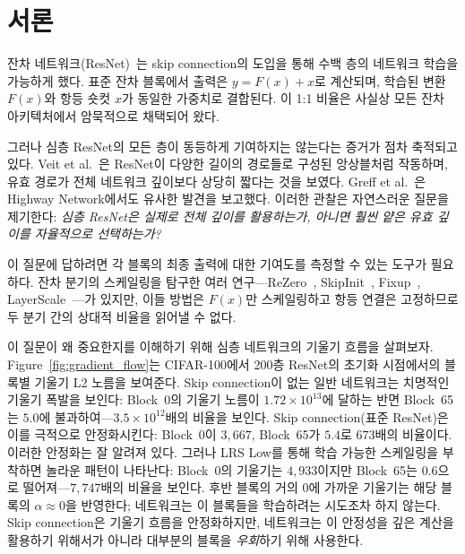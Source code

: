 \documentclass[preprint,12pt]{elsarticle}
\begin{document}
\section{서론}
\label{sec:intro}

잔차 네트워크(ResNet)~\cite{he2016deep}는 skip connection의 도입을 통해 수백 층의 네트워크 학습을 가능하게 했다. 표준 잔차 블록에서 출력은 $y = F(x) + x$로 계산되며, 학습된 변환 $F(x)$와 항등 숏컷 $x$가 동일한 가중치로 결합된다. 이 1:1 비율은 사실상 모든 잔차 아키텍처에서 암묵적으로 채택되어 왔다.

그러나 심층 ResNet의 모든 층이 동등하게 기여하지는 않는다는 증거가 점차 축적되고 있다. Veit et al.~\cite{veit2016residual}은 ResNet이 다양한 길이의 경로들로 구성된 앙상블처럼 작동하며, 유효 경로가 전체 네트워크 깊이보다 상당히 짧다는 것을 보였다. Greff et al.~\cite{greff2017highway}은 Highway Network에서도 유사한 발견을 보고했다. 이러한 관찰은 자연스러운 질문을 제기한다: \emph{심층 ResNet은 실제로 전체 깊이를 활용하는가, 아니면 훨씬 얕은 유효 깊이를 자율적으로 선택하는가?}

이 질문에 답하려면 각 블록의 최종 출력에 대한 기여도를 측정할 수 있는 도구가 필요하다. 잔차 분기의 스케일링을 탐구한 여러 연구---ReZero~\cite{bachlechner2021rezero}, SkipInit~\cite{de2020batch}, Fixup~\cite{zhang2019fixup}, LayerScale~\cite{touvron2021going}---가 있지만, 이들 방법은 $F(x)$만 스케일링하고 항등 연결은 고정하므로 두 분기 간의 상대적 비율을 읽어낼 수 없다.

이 질문이 왜 중요한지를 이해하기 위해 심층 네트워크의 기울기 흐름을 살펴보자. Figure~\ref{fig:gradient_flow}는 CIFAR-100에서 200층 ResNet의 초기화 시점에서의 블록별 기울기 L2 노름을 보여준다. Skip connection이 없는 일반 네트워크는 치명적인 기울기 폭발을 보인다: Block~0의 기울기 노름이 $1.72 \times 10^{13}$에 달하는 반면 Block~65는 $5.0$에 불과하여---$3.5 \times 10^{12}$배의 비율을 보인다. Skip connection(표준 ResNet)은 이를 극적으로 안정화시킨다: Block~0이 $3{,}667$, Block~65가 $5.4$로 $673$배의 비율이다. 이러한 안정화는 잘 알려져 있다. 그러나 LRS Low를 통해 학습 가능한 스케일링을 부착하면 놀라운 패턴이 나타난다: Block~0의 기울기는 $4{,}933$이지만 Block~65는 $0.6$으로 떨어져---$7{,}747$배의 비율을 보인다. 후반 블록의 거의 0에 가까운 기울기는 해당 블록의 $\alpha \approx 0$을 반영한다; 네트워크는 이 블록들을 학습하려는 시도조차 하지 않는다. Skip connection은 기울기 흐름을 안정화하지만, 네트워크는 이 안정성을 깊은 계산을 활용하기 위해서가 아니라 대부분의 블록을 \emph{우회}하기 위해 사용한다.
\end{document}
